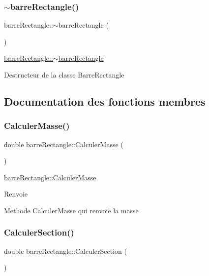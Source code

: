 \subsubsection{\texorpdfstring{$\sim$barre\+Rectangle()}{~barreRectangle()}}
{\footnotesize\ttfamily barre\+Rectangle\+::$\sim$barre\+Rectangle (\begin{DoxyParamCaption}{ }\end{DoxyParamCaption})}



\hyperlink{classbarre_rectangle_a27c21df460fbde7f24ac2a7540558091}{barre\+Rectangle\+::$\sim$barre\+Rectangle} 

Destructeur de la classe Barre\+Rectangle 

\subsection{Documentation des fonctions membres}
\mbox{\label{classbarre_rectangle_ac558660f43d5e18472aaa57ee98d5fd0}} 
\subsubsection{\texorpdfstring{Calculer\+Masse()}{CalculerMasse()}}
{\footnotesize\ttfamily double barre\+Rectangle\+::\+Calculer\+Masse (\begin{DoxyParamCaption}{ }\end{DoxyParamCaption})}



\hyperlink{classbarre_rectangle_ac558660f43d5e18472aaa57ee98d5fd0}{barre\+Rectangle\+::\+Calculer\+Masse} 

\begin{DoxyReturn}{Renvoie}

\end{DoxyReturn}
Methode Calculer\+Masse qui renvoie la masse \mbox{\label{classbarre_rectangle_a321e3526a980b5d48a5cf9a05ee2b63a}} 
\subsubsection{\texorpdfstring{Calculer\+Section()}{CalculerSection()}}
{\footnotesize\ttfamily double barre\+Rectangle\+::\+Calculer\+Section (\begin{DoxyParamCaption}{ }\end{DoxyParamCaption})}



